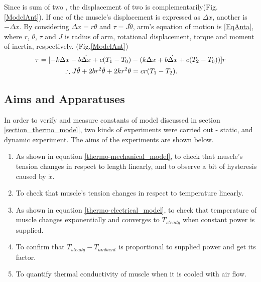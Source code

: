 Since \anta is sum of two \scpnospace, the displacement of two \scp is complementarily(Fig.\ref{ModelAnt}). If one of the muscle's displacement is expressed as $\Delta{x}$, another is $-\Delta{x}$. By considering $\Delta{x}=r\theta$ and $\tau=J\ddot{\theta}$, arm's equation of motion is \eqref{EqAnta}, where $r$, $\theta$, $\tau$ and $J$ is radius of arm, rotational displacement, torque and moment of inertia, respectively.
(Fig.\ref{ModelAnt})
\begin{align}
\tau = [-k\Delta x-b\dot{\Delta x}+c(T_1-T_0) & - (k\Delta x+b\dot{\Delta x}+c(T_2-T_0))]r \notag \\
\therefore J\ddot{\theta}+2br^2\dot{\theta}+2kr^2\theta & =cr(T_1-T_2). \label{EqAnta}
\end{align}

\subsection{Aims and Apparatuses}\label{section_aimsappa}
In order to verify and measure constants of model discussed in section \ref{section_thermo_model}, two kinds of experiments were carried out - static, and dynamic experiment. The aims of the experiments are shown below.

\begin{enumerate} 
\item As shown in equation \eqref{thermo-mechanical_model}, to check that muscle's tension changes in respect to length linearly, and to observe a bit of hysteresis caused by $\dot{x}$.
\item To check that muscle's tension changes in respect to temperature linearly.
\item As shown in equation \eqref{thermo-electrical_model}, to check that temperature of muscle changes exponentially and converges to $T_{steady}$ when constant power is supplied.
\item To confirm that $T_{steady}-T_{ambient}$ is proportional to supplied power and get its factor. 
\item To quantify thermal conductivity of muscle when it is cooled with air flow.
\end{enumerate}

